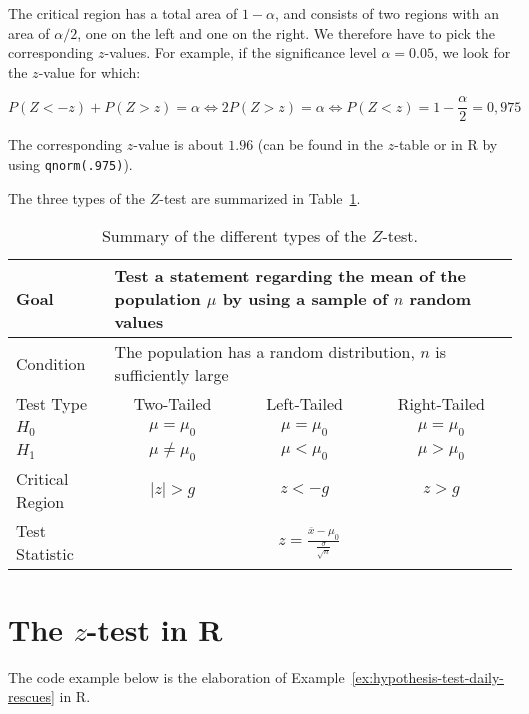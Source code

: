 The critical region has a total area of $1 - \alpha$, and consists of two regions with an area of $\alpha / 2$, one on the left and one on the right.
We therefore have to pick the corresponding $z$-values. For example, if the significance level $\alpha = 0.05$, we look for the $z$-value for which:

\[P(Z < -z) + P(Z > z) = \alpha \Leftrightarrow 2 P(Z>z) = \alpha \Leftrightarrow P(Z < z) = 1-\frac{\alpha}{2} = 0,975\]

The corresponding $z$-value is about $1.96$ (can be found in the $z$-table or in R by using \texttt{qnorm(.975)}).

The three types of the $Z$-test are summarized in Table~\ref{tab:z-test-types}.

\begin{table}
  \centering
  \begin{tabular}{l|ccc}
    \toprule
    Goal              & \multicolumn{3}{l}{\parbox{.5\textwidth}{Test a statement regarding the mean of the population $\mu$ by using a sample of $n$ random values}} \\
    \midrule
    Condition         & \multicolumn{3}{l}{\parbox{.5\textwidth}{The population has a random distribution, $n$ is sufficiently large}} \\
    \midrule
    Test Type         & Two-Tailed           & Left-Tailed     & Right-Tailed     \\
    \midrule
    $H_{0}$           & $\mu = \mu_{0}$      & $\mu = \mu_{0}$ & $\mu = \mu_{0}$  \\
    $H_{1}$           & $\mu \neq \mu_{0}$   & $\mu < \mu_{0}$ & $\mu > \mu_{0}$  \\
    Critical Region   & $\left|z\right| > g$ & $z< -g $        & $z>g$            \\
    Test Statistic    & \multicolumn{3}{c}{$z = \frac{\overline{x} - \mu_{0}}{\frac{\sigma}{\sqrt{n}}}$} \\
    \bottomrule
  \end{tabular}
  \caption{Summary of the different types of the $Z$-test.}
  \label{tab:z-test-types}
\end{table}

\section{The \texorpdfstring{$z$}{z}-test in R}
\label{sec:z-test-R}

The code example below is the elaboration of Example~\ref{ex:hypothesis-test-daily-rescues} in R.

